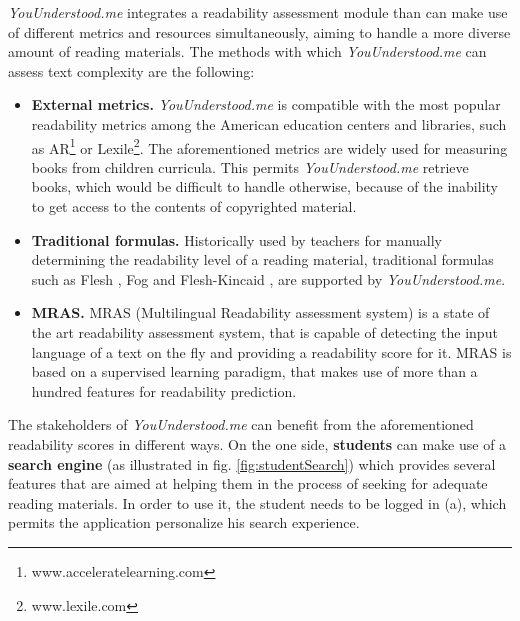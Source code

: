 \documentclass{sig-alternate-05-2015}
\begin{document}
\textit{YouUnderstood.me} integrates a readability assessment module than can make use of different metrics and resources simultaneously, aiming to handle a more diverse amount of reading materials. The methods with which  \textit{YouUnderstood.me} can assess text complexity are the following:

\begin{itemize}
\item \textbf{External metrics.} \textit{YouUnderstood.me} is compatible with the most popular readability metrics among the American education centers and libraries, such as AR\footnote{www.acceleratelearning.com} or Lexile\footnote{www.lexile.com}. The aforementioned metrics are widely used for measuring books from children curricula. This permits \textit{YouUnderstood.me} retrieve books, which would be difficult to handle otherwise, because of the inability to get access to the contents of copyrighted material.
\item \textbf{Traditional formulas.} Historically used by teachers for manually determining the readability level of a reading material, traditional formulas such as Flesh \cite{flesch1948new}, Fog\cite{gunning1952technique} and Flesh-Kincaid \cite{flesch1948new}, are supported by \textit{YouUnderstood.me}. 
\item \textbf{MRAS.} MRAS \cite{imadrazo2016readability} (Multilingual Readability assessment system) is a state of the art readability assessment system, that is capable of detecting the input language of a text on the fly and providing a readability score for it. MRAS is based on a supervised learning paradigm, that makes use of more than a hundred features for readability prediction. 



\end{itemize}

The stakeholders of \textit{YouUnderstood.me} can benefit from the aforementioned readability scores in different ways. On the one side, \textbf{students} can make use of a \textbf{search engine} (as illustrated in fig. \ref{fig:studentSearch}) which provides several features that are aimed at helping them in the process of seeking for adequate reading materials. In order to use it, the student needs to be logged in (a), which permits the application personalize his search experience.
\end{document}
